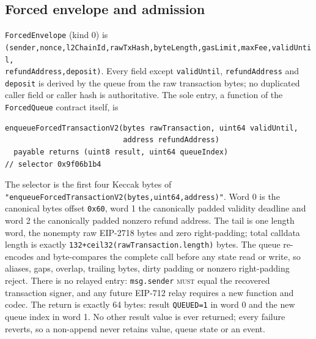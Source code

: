 \documentclass[a4paper,11pt]{article}
\newcommand{\code}[1]{\nolinkurl{#1}}
\newcommand{\must}{\textsc{must}}
\begin{document}
\subsection{Forced envelope and admission}\label{sec:forced-envelope}

\code{ForcedEnvelope} (kind 0) is
\code{(sender,nonce,l2ChainId,rawTxHash,byteLength,gasLimit,maxFee,validUntil,
refundAddress,deposit)}.  Every field except \code{validUntil},
\code{refundAddress} and \code{deposit} is derived by the queue from the raw
transaction bytes; no duplicated caller field or caller hash is
authoritative.  The sole entry, a function of the \code{ForcedQueue} contract
itself, is
\begin{verbatim}
enqueueForcedTransactionV2(bytes rawTransaction, uint64 validUntil,
                           address refundAddress)
  payable returns (uint8 result, uint64 queueIndex)
// selector 0x9f06b1b4
\end{verbatim}
The selector is the first four Keccak bytes of
\code{"enqueueForcedTransactionV2(bytes,uint64,address)"}.  Word 0 is the
canonical bytes offset \code{0x60}, word 1 the canonically padded validity
deadline and word 2 the canonically padded nonzero refund address.  The tail
is one length word, the nonempty raw EIP-2718 bytes and zero right-padding;
total calldata length is exactly \code{132+ceil32(rawTransaction.length)}
bytes.  The queue re-encodes and byte-compares the complete call before any
state read or write, so aliases, gaps, overlap, trailing bytes, dirty padding
or nonzero right-padding reject.  There is no relayed entry: \code{msg.sender}
\must{} equal the recovered transaction signer, and any future EIP-712 relay
requires a new function and codec.  The return is exactly 64 bytes: result
\code{QUEUED=1} in word 0 and the new queue index in word 1.  No other result
value is ever returned; every failure reverts, so a non-append never retains
value, queue state or an event.
\end{document}
